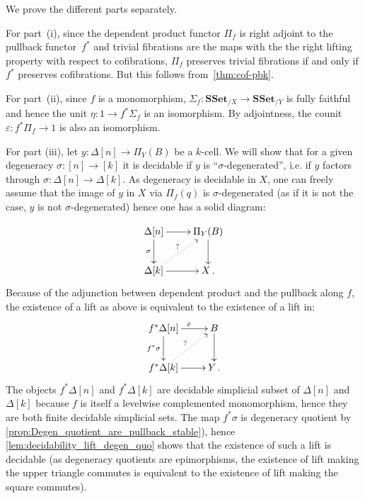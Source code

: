 \documentclass[reqno,10pt,a4paper,oneside,draft]{amsart}
\makeatletter
\renewenvironment{proof}[1][\proofname] {\par\pushQED{\qed}\normalfont\topsep6\p@\@plus6\p@\relax\trivlist\item[\hskip\labelsep\bf#1\@addpunct{.}]\ignorespaces}{\popQED\endtrivlist\@endpefalse}
\numberwithin{equation}{section}
\theoremstyle{mythm}
\theoremstyle{mydef}
\theoremstyle{myrmk}
\newcommand{\co}{\colon}
\newcommand{\SSet}{\mathbf{SSet}}
\makeatother
\begin{document}
 
\begin{proof} We prove the different parts separately. 

For part~(i), since the dependent product functor $\Pi_f$ is right adjoint to the pullback functor~$f^*$ and trivial fibrations are the maps with the the right lifting property with respect to cofibrations, $\Pi_f$ preserves trivial fibrations if and only if $f^*$ preserves cofibrations. But this follows from~\cref{thm:cof-pbk}.

For part~(ii),  since $f$ is a monomorphism,  $\Sigma_f \co \SSet_{/X} \rightarrow \SSet_{/Y}$ is fully faithful and hence the unit $\eta \co 1 \rightarrow f^*  \Sigma_{f}$ is an isomorphism. By adjointness, the counit $\varepsilon \co f^* \Pi_f \rightarrow 1$ is also an isomorphism. 

For part (iii), let $y \co  \Delta[n] \rightarrow \Pi_Y(B)$ be a  $k$-cell. We will show that for a given degeneracy $\sigma \co [n] \rightarrow [k]$ it is decidable if $y$ is ``$\sigma$-degenerated'', i.e. if $y$ factors through $\sigma \co \Delta[n] \rightarrow \Delta[k]$. As degeneracy is decidable in $X$, one can freely assume that the image of   $y$ in $X$ via $\Pi_f(q)$ is $\sigma$-degenerated (as if it is not the case, $y$ is not $\sigma$-degenerated) hence one has a solid diagram:

\[
\xymatrix{
\Delta[n] \ar[d]_{\sigma} \ar[r] & \Pi_Y(B) \ar[d] \\
\Delta[k] \ar@{.>}[ur]^? \ar[r] & X \, . \\
}
\]
Because of the adjunction between dependent product and the pullback along $f$, the existence of a lift as above is equivalent to the existence of a lift in:
\[
\xymatrix{
f^* \Delta[n] \ar[d]_{f^* \sigma} \ar[r]^x & B \ar[d] \\
f^* \Delta[k] \ar@{.>}[ur]^? \ar[r] & Y \, .  \\
}
\]
The objects $f^* \Delta[n]$ and $f^* \Delta[k]$ are decidable simplicial subset of $\Delta[n]$ and $\Delta[k]$ because $f$ is itself a levelwise complemented monomorphism, hence they are both finite decidable simplicial sets. The map $f^* \sigma$ is degeneracy quotient by \cref{prop:Degen_quotient_are_pullback_stable}), hence \cref{lem:decidability_lift_degen_quo} shows that the existence of such a lift is decidable (as degeneracy quotients are epimorphisms, the existence of lift making the upper triangle commutes is equivalent to the existence of lift making the square commutes).




\end{proof}
\end{document}
